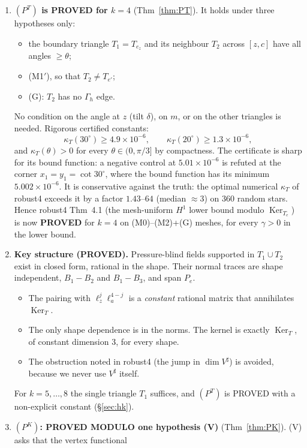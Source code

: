 \documentclass[11pt]{article}
\theoremstyle{remark}
\newcommand{\Gh}{\Gamma_h}
\begin{document}
\begin{enumerate}
\item \textbf{$(P^T)$ is PROVED for $k=4$} (Thm~\ref{thm:PT}). It holds under three hypotheses only:
 \begin{itemize}
 \item the boundary triangle $T_1=T_{e_z}$ and its neighbour $T_2$ across $[z,c]$ have all angles $\ge\theta$;
 \item (M1$'$), so that $T_2\ne T_{e'}$;
 \item (G): $T_2$ has no $\Gh$ edge.
 \end{itemize}
 No condition on the angle at $z$ (tilt $\delta$), on $m$, or on the other triangles is needed. Rigorous certified constants:
 \[
 \kappa_T(30^\circ)\ge4.9\times10^{-6},\qquad\kappa_T(20^\circ)\ge1.3\times10^{-6},
 \]
 and $\kappa_T(\theta)>0$ for every $\theta\in(0,\pi/3]$ by compactness. The certificate is sharp for its bound
 function: a negative control at $5.01\times10^{-6}$ is refuted at the corner $x_1=y_1=\cot30^\circ$, where the bound function has
 its minimum $5.002\times10^{-6}$. It is conservative against the truth: the optimal numerical $\kappa_T$ of robust4 exceeds it by a factor
 $1.43$--$64$ (median $\approx3$) on 360 random stars. Hence robust4 Thm~4.1 (the mesh-uniform $H^1$ lower bound modulo $\operatorname{Ker}_{T_e}$) is now
 \textbf{PROVED} for $k=4$ on (M0)--(M2)+(G) meshes, for every $\gamma>0$ in the lower bound.
\item \textbf{Key structure (PROVED).} Pressure-blind fields supported in $T_1\cup T_2$ exist in closed form, rational in the
 shape. Their normal traces are shape independent, $B_1-B_2$ and $B_1-B_3$, and span $P_e$.
 \begin{itemize}
 \item The pairing with $\ell_z^j\ell_a^{4-j}$ is a \emph{constant} rational matrix that annihilates $\operatorname{Ker}_T$.
 \item The only shape dependence is in the norms. The kernel is exactly $\operatorname{Ker}_T$, of constant dimension 3, for every shape.
 \item The obstruction noted in robust4 (the jump in $\dim V^\sharp$) is avoided, because we never use $V^\sharp$ itself.
 \end{itemize}
 For $k=5,\dots,8$ the single triangle $T_1$ suffices, and $(P^T)$ is PROVED with a non-explicit constant (\S\ref{sec:hk}).
\item \textbf{$(P^K)$: PROVED MODULO one hypothesis (V)} (Thm~\ref{thm:PK}). (V) asks that the vertex functional

\end{enumerate}
\end{document}
